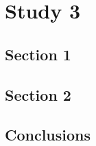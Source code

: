 \chapter{Study 3} \label{chap:study_3}

\section{Section 1}

\section{Section 2}

\section{Conclusions}